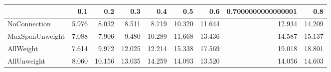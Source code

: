 \begin{tabular}{lrrrrrrrr}
\toprule
{} &   0.1 &    0.2 &    0.3 &    0.4 &    0.5 &    0.6 & 0.7000000000000001 &    0.8 \\
\midrule
NoConnection    & 5.976 &  8.032 &  8.511 &  8.719 & 10.320 & 11.644 &             12.934 & 14.209 \\
MaxSpanUnweight & 7.088 &  7.906 &  9.480 & 10.289 & 11.668 & 13.436 &             14.587 & 15.137 \\
AllWeight       & 7.614 &  9.972 & 12.025 & 12.214 & 15.338 & 17.569 &             19.018 & 18.801 \\
AllUnweight     & 8.060 & 10.156 & 13.035 & 14.259 & 14.093 & 13.520 &             14.056 & 14.603 \\
\bottomrule
\end{tabular}
